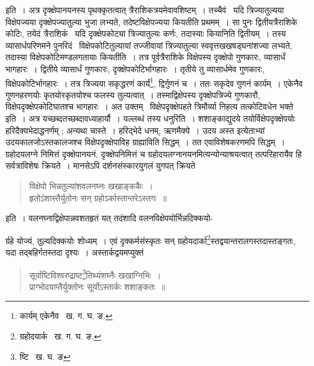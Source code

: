 \documentclass[11pt, openany]{book}
\begin{document}
\noindent इति~। अत्र दृक्क्षेपानयनस्य पृथक्कृतत्वात् त्रैराशिकत्रयमेवावशिष्टम्~। तच्चैवं \textendash\ यदि त्रिज्यातुल्यया विक्षेपज्यया दृक्क्षेपज्यातुल्या भुजा लभ्यते, तदेष्टविक्षेपज्यया कियतीति प्रथमम्~। सा पुनः द्वितीयत्रैराशिके कोटिः, तयेदं त्रैराशिकं \textendash\ यदि दृक्क्षेपकोट्या त्रिज्यातुल्यः कर्णः, तदास्याः कियानिति द्वितीयम्~। तस्य व्यासार्धपरिणमने पुनरिदं \textendash\ विक्षेपकोटितुल्यायां तज्जीवायां त्रिज्यातुल्या स्ववृत्तखखषड्घनांशज्या लभ्यते, तदास्या विक्षेपकोटिमण्डलगतायाः कियतीति~। तत्र पूर्वत्रैराशिके विक्षेपस्य दृक्क्षेपो गुणकारः, व्यासार्धं भागहारः~। द्वितीये व्यासार्धं गुणकारः, दृक्क्षेपकोटिर्भागहारः~। तृतीये तु व्यासार्धमेव गुणकारः, विक्षेपकोटिर्भागहारः~। तत्र त्रिज्यया सकृद्धरणं कार्यं\renewcommand{\thefootnote}{१}\footnote{कार्यम् एकेनैव \textendash\ ख. ग. घ. ङ.}, द्विर्गुणनं च~। ततः सकृदेव गुणनं कार्यम्~। एकेनैव गुणनहरणयोः कृतयोरकृतयोश्च फलस्य तुल्यत्वात्~। तस्माद्विक्षेपस्य दृक्क्षेपत्रिज्ये गुणकारौ, विक्षेपदृक्क्षेपकोटिघातश्च भागहारः~। अत उक्तम् \textendash\ {\qt विक्षेपदृक्क्षेपहते त्रिमौर्व्या निहत्य तत्कोटिवधेन भक्ते} इति~। अत्र यच्छब्दतच्छब्दावध्याहार्यौ~। यल्लब्धं तस्य धनुरिति~। शशाङ्काद्युदये तयोर्विक्षेपदृक्क्षेपयोः हरिदैक्यभेदाद्धनर्णम् ; अन्यथा चास्ते~। हरिद्भेदे धनम्, ऋणमैक्ये~। उदय अस्त इत्येताभ्यां उदयकालजोऽस्तकालजश्च विक्षेपदृक्क्षेपाविह ग्राह्याविति सिद्धम्~। तत एवाविशेषकरणमपि सिद्धम्~। ग्रहोदयलग्ने निमित्तं दृक्क्षेपानयनं, दृक्क्षेपनिमित्तं च ग्रहोदयलग्नानयनमित्यन्योन्याश्रयत्वात् तत्परिहारायैव हि सर्वत्राविशेषः क्रियते~। मानसेऽपि दर्शनसंस्कारयुगलं युगपत् क्रियते\textendash 

\begin{quote}
{\qt विक्षेपो भिन्नतुल्यांशवलनघ्नः खखाङ्ककैः~।\\
हृतोऽंशास्तैर्युतोनः सन् ग्रहोऽर्कास्तान्तरेऽस्तगः~॥}
\end{quote}

\noindent इति~। वलनघ्नाद्विक्षेपान्नवशतहृतं यत् तदंशादि वलनविक्षेपयोर्भिन्नदिक्कयो- 

\newpage
\begin{sloppypar} 
\noindent र्ग्रहे योज्यं, तुल्यदिक्कयोः शोध्यम्~। एवं दृक्कर्मसंस्कृतः सन् ग्रहोयदार्का\renewcommand{\thefootnote}{१}\footnote{ग्रहोदयार्क \textendash\ ख. ग. घ. ङ.}स्तद्वयान्तरालगस्तदास्तङ्गतः, यदा तद्बहिर्गतस्तदा दृश्यः~। अस्तार्कद्वयमप्युक्तं\textendash 
\end{sloppypar} 
\begin{quote}
{\qt सूर्याष्टिविश्वरुद्राष्ट\renewcommand{\thefootnote}{२}\footnote{ष्टि \textendash\ ख. घ. ङ}तिथ्यंशघ्नैः खखाग्निभिः~।\\
    प्राग्भोदयाप्तैर्युक्तोनः सूर्योऽस्तार्कः शशाङ्कतः~॥} 
\end{quote}
\end{document}
